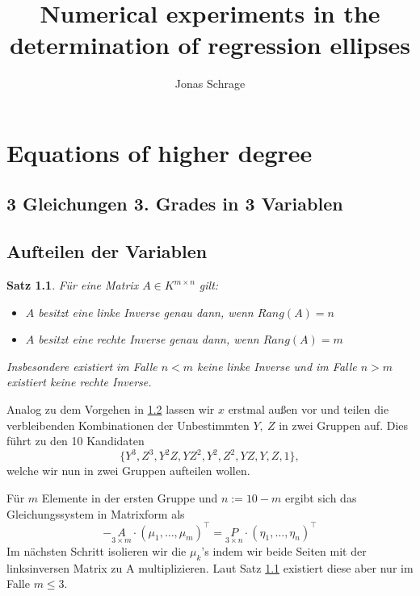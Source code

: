 \documentclass[a4paper,twoside, 11pt]{book}
\author{Jonas Schrage}
\title{Numerical experiments in the determination of regression ellipses}
\date{}
\newcommand{\coloneqq}{:=}
\theoremstyle{custom}
\newtheorem{proposition}[theorem]{Satz}
\theoremstyle{custom}
\begin{document}
	
	\maketitle
	\newpage
	\tableofcontents
	\newpage
	\chapter{Equations of higher degree}
	\section{3 Gleichungen 3. Grades in 3 Variablen}
	\newpage
	\section{Aufteilen der Variablen}
	\begin{proposition}\label{prop:gen_inv}
		Für eine Matrix $A \in K^{m\times n}$ gilt:
		\begin{itemize}
			 \item[$-$] $A$ besitzt eine linke Inverse genau dann, wenn $Rang(A) = n$
			 \item[$-$] $A$ besitzt eine rechte Inverse genau dann, wenn $Rang(A) = m$
		\end{itemize}
		Insbesondere existiert im Falle $n<m$ keine linke Inverse und im Falle $n>m$ existiert keine rechte Inverse.
	\end{proposition}

	Analog zu dem Vorgehen in \ref{} lassen wir $x$ erstmal außen vor und teilen die verbleibenden Kombinationen der Unbestimmten $Y,\ Z$ in zwei Gruppen auf.
	Dies führt zu den 10 Kandidaten 
	\begin{equation}
		\{Y^3,Z^3,Y^2Z,YZ^2,Y^2,Z^2,YZ,Y,Z,1\},
	\end{equation}
	welche wir nun in zwei Gruppen aufteilen wollen.
	
	Für $m$ Elemente in der ersten Gruppe und $n \coloneqq 10-m$ ergibt sich das Gleichungssystem in Matrixform als
	\begin{equation}
		-\underset{\scriptscriptstyle 3\times m}{A} \cdot \left(\mu_1,\ldots,\mu_m\right)^{\intercal} = \underset{\scriptscriptstyle 3\times n}{P} \cdot \left(\eta_1,\ldots,\eta_n\right)^{\intercal}
	\end{equation}
	Im nächsten Schritt isolieren wir die $\mu_k$'s indem wir beide Seiten mit der linksinversen Matrix zu A multiplizieren. Laut Satz \ref{prop:gen_inv} existiert diese aber nur im Falle $m \leq 3$.
	
\end{document}
